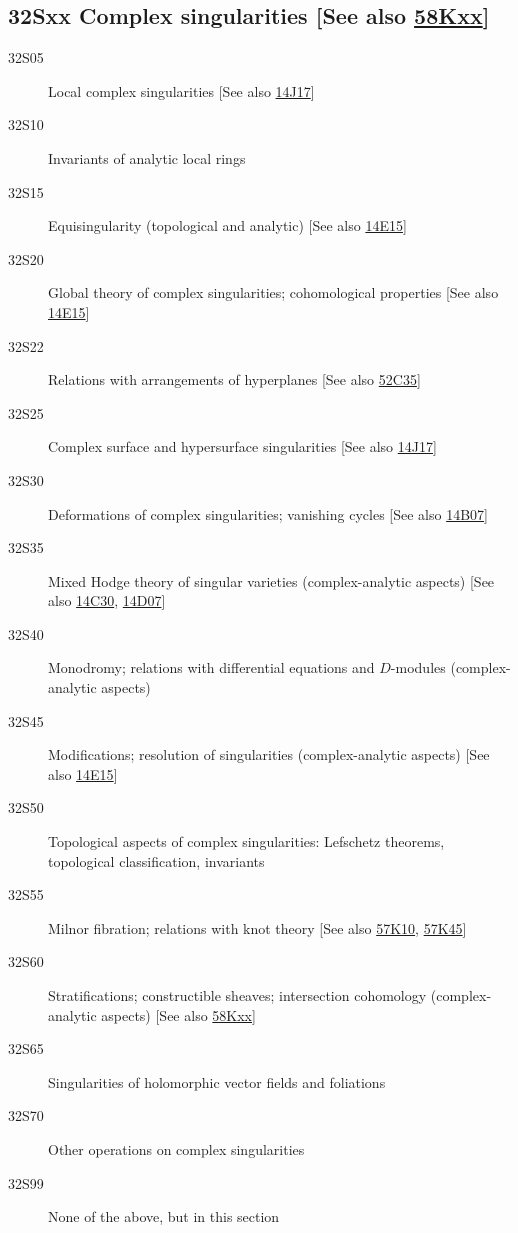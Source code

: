 \subsection*{32Sxx  Complex singularities [See also \hyperref[58Kxx]{58Kxx}] }\label{32Sxx}
\begin{description}  
\item [32S05]\label{32S05} Local complex singularities [See also \hyperref[14J17]{14J17}]
\item [32S10]\label{32S10} Invariants of analytic local rings
\item [32S15]\label{32S15} Equisingularity (topological and analytic) [See also \hyperref[14E15]{14E15}]
\item [32S20]\label{32S20} Global theory of complex singularities; cohomological properties [See also \hyperref[14E15]{14E15}]
\item [32S22]\label{32S22} Relations with arrangements of hyperplanes [See also \hyperref[52C35]{52C35}]
\item [32S25]\label{32S25} Complex surface and hypersurface singularities [See also \hyperref[14J17]{14J17}]
\item [32S30]\label{32S30} Deformations of complex singularities; vanishing cycles [See also \hyperref[14B07]{14B07}]
\item [32S35]\label{32S35} Mixed Hodge theory of singular varieties (complex-analytic aspects) [See also \hyperref[14C30]{14C30}, \hyperref[14D07]{14D07}]
\item [32S40]\label{32S40} Monodromy; relations with differential equations and $D$-modules (complex-analytic aspects) 
\item [32S45]\label{32S45} Modifications; resolution of singularities (complex-analytic aspects) [See also \hyperref[14E15]{14E15}]
\item [32S50]\label{32S50} Topological aspects of complex singularities: Lefschetz theorems, topological classification, invariants
\item [32S55]\label{32S55} Milnor fibration; relations with knot theory [See also \hyperref[57K10]{57K10}, \hyperref[57K45]{57K45}]
\item [32S60]\label{32S60} Stratifications; constructible sheaves; intersection cohomology (complex-analytic aspects) [See also \hyperref[58Kxx]{58Kxx}]
\item [32S65]\label{32S65} Singularities of holomorphic vector fields and foliations
\item [32S70]\label{32S70} Other operations on complex singularities
\item [32S99]\label{32S99} None of the above, but in this section
\end{description}
